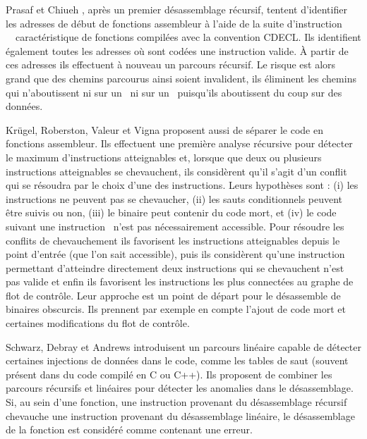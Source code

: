 Prasaf et Chiueh \cite{PC03}, après un premier désassemblage récursif, tentent d'identifier les adresses de début de fonctions assembleur à l'aide de la suite d'instruction \push\ \mov\ caractéristique de fonctions compilées avec la convention CDECL. Ils identifient également toutes les adresses où sont codées une instruction valide. À partir de ces adresses ils effectuent à nouveau un parcours récursif. Le risque est alors grand que des chemins parcourus ainsi soient invalident, ils éliminent les chemins qui n'aboutissent ni sur un \ret\ ni sur un \jmp\ puisqu'ils aboutissent du coup sur des données.





Krügel, Roberston, Valeur et Vigna \cite{KruegelRVV04} proposent aussi de séparer le code en fonctions assembleur. Ils effectuent une première analyse récursive pour détecter le maximum d'instructions atteignables et, lorsque que deux ou plusieurs instructions atteignables se chevauchent, ils considèrent qu'il s'agit d'un conflit qui se résoudra par le choix d'une des instructions.
Leurs hypothèses sont : (i) les instructions ne peuvent pas se chevaucher, (ii) les sauts conditionnels peuvent être suivis ou non, (iii) le binaire peut contenir du code mort, et (iv) le code suivant une instruction \call\ n'est pas nécessairement accessible. Pour résoudre les conflits de chevauchement ils favorisent les instructions atteignables depuis le point d'entrée (que l'on sait accessible), puis ils considèrent qu'une instruction permettant d'atteindre directement deux instructions qui se chevauchent n'est pas valide et enfin ils favorisent les instructions les plus connectées au graphe de flot de contrôle.
Leur approche est un point de départ pour le désassemble de binaires obscurcis. Ils prennent par exemple en compte l'ajout de code mort et certaines modifications du flot de contrôle.

Schwarz, Debray et Andrews \cite{SDA02} introduisent un parcours linéaire capable de détecter certaines injections de données dans le code, comme les tables de saut (souvent présent dans du code compilé en C ou C++). Ils proposent de combiner les parcours récursifs et linéaires pour détecter les anomalies dans le désassemblage. Si, au sein d'une fonction, une instruction provenant du désassemblage récursif chevauche une instruction provenant du désassemblage linéaire, le désassemblage de la fonction est considéré comme contenant une erreur.
\\


